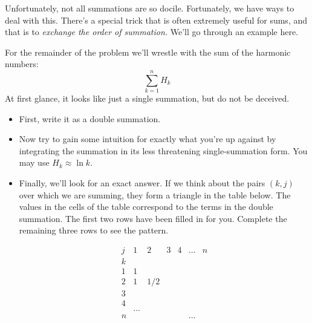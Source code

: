 \documentclass[12pt]{article}
\begin{document}
Unfortunately, not all summations are so docile. Fortunately, we have
ways to deal with this. There's a special trick that is often
extremely useful for sums, and that is to \emph{exchange the order of
  summation.}  We'll go through an example here.

For the remainder of the problem we'll wrestle with the sum of the
harmonic numbers:
\[
\sum_{k=1}^n H_k
\]
At first glance, it looks like just a single summation, but do not be
deceived.

\begin{itemize}

\item 
First, write it as a double summation.

\solution[\vspace{.5in}]{
\[
\sum_{k=1}^n H_k = \sum_{k=1}^n \sum_{j=1}^k 1/j
\]
}

\item 
Now try to gain some intuition for exactly what you're up against by
integrating the summation in its less threatening single-summation
form. You may use $H_k \approx \ln k$.

\solution[\vspace{.5in}]{
\[
\sum_{k=1}^n H_k \approx \int_{k=1}^n \ln n = n\ln n-n+1.
\]
}


\item Finally, we'll look for an exact answer. If we think about the
  pairs $(k,j)$ over which we are summing, they form a triangle in the
  table below. The values in the cells of the table correspond to the
  terms in the double summation. The first two rows have been filled
  in for you. Complete the remaining three rows to see the pattern.

\[
\begin{array}{c|cccccc}
j&1&2&3&4&\dots&n\\
\hline
k\\
1&1\\
2 &1&1/2\\
3 \\
4 \\
 &\dots\\
n &&&&&\dots
\end{array}
\]



\end{itemize}
\end{document}
